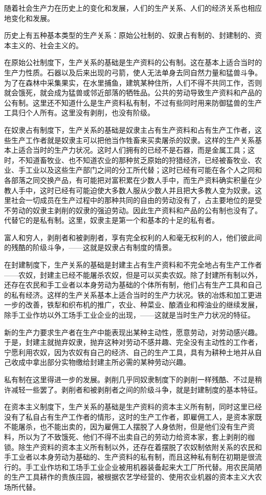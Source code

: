 随着社会生产力在历史上的变化和发展，人们的生产关系、人们的经济关系也相应地变化和发展。

历史上有五种基本类型的生产关系：原始公社制的、奴隶占有制的、封建制的、资本主义的、社会主义的。

在原始公社制度下，生产关系的基础是生产资料的公有制。这在基本上适合当时的生产力性质。石器以及后来出现的弓箭，使人无法单身去同自然力量和猛兽斗争。为了在森林中采集果实，在水里捕鱼，建筑某种住所，人们不得不共同工作，否则就会饿死，就会成为猛兽或邻近部落的牺牲品。公共的劳动导致生产资料和产品的公有制。这里还不知道什么是生产资料私有制，不过有些同时用来防御猛兽的生产工具归个人所有。这里没有剥削，也没有阶级。

在奴隶占有制度下，生产关系的基础是奴隶主占有生产资料和占有生产工作者，这些生产工作者就是奴隶主可以把他当作牲畜来买卖屠杀的奴隶。这样的生产关系基本上适合当时的生产力状况。这时人们拥有的已经不是石器，而是金属工具；这时，不知道畜牧业、也不知道农业的那种贫乏原始的狩猎经济，已经被畜牧业、农业、手工业以及这些生产部门之间的分工所代替；这时已经有可能在各个人之同和各部落之同交换产品，有可能把对富积累在少数人手中，而生产资料确实积量在少教人手中，这时已经有可能迫使大多数人服从少数人并且把大多教人变为奴隶。这里社会一切成员在生产过程中的那种共同的自由的劳动没有了，占主要地位的是受不劳动的奴隶主剥削的奴隶的强迫劳动。因此生产资料和产品的公有制也没有了。代替它的是私有制。这里，奴隶主是第一个和基本的十足的私有者。

富人和穷人，剥削者和被剥削者，享有完全权利的人和毫无权利的人，他们彼此间的残酷的阶级斗争，——这就是奴隶占有制度的情景。

在封建制度下，生产关系的基础是封建主占有生产资料和不完全地占有生产工作者——农奴，封建主已经不能屠杀农奴，但是可以买卖农奴。除了封建所有制以外，还存在农民和手工业者以本身劳动为基础的个体所有制，他们占有生产工具和自己的私有经济。这样的生产关系基本上适合当时的生产力状况。铁的冶炼和加工更进一步的改善，铁犁和织布机的推广，农业、种菜业、酿酒业和榨油业的继续发展，除手工业作坊以外工场手工业企业的出现，——这就是当时生产力状况的特征。

新的生产力要求生产者在生产中能表现出某种主动性，愿意劳动，对劳动感兴趣。于是，封建主就抛弃奴隶，抛弃这种对劳动不感并趣、完全没有主动性的工作者，宁愿利用农奴，因为农奴有自己的经济、自己的生产工具，具有为耕种土地并从自己收成中拿出部分实物缴给封建主所必需的某种劳动兴趣。

私有制在这里得进一步的发展。剥削几乎同奴隶制度下的剥削一样残酷、不过是稍许减轻一些罢了。剥削者和被剥削者之间的阶级斗争，就是封建制度的基本特征。

在资本主义制度下，生产关系的基础是生产资料的资本主义所有制，同时这里已经没有了私自占有生产工作者的情形，这时的生产工作者，即雇佣工人，是资本家既不能屠杀，也不能出卖的，因为雇佣工人摆脱了人身依附，但是他们没有生产资料，所以为了不致饿死、他们不得不出卖自己的劳动力给资本家，套上剥削的枷锁。除生产资料的资本主义所有制以外，还存在着摆脱了农奴制依附关系的农民和手工业者以本身劳动为基础的、生产资料的私有制，而且这种私有制在初期是很流行的。手工业作坊和工场手工业企业被用机器装备起来大工厂所代替。用农民简陋的生产工具耕作的贵族庄园，被根据农艺学经营的、使用农业机器的资本主义大农场所代替。

